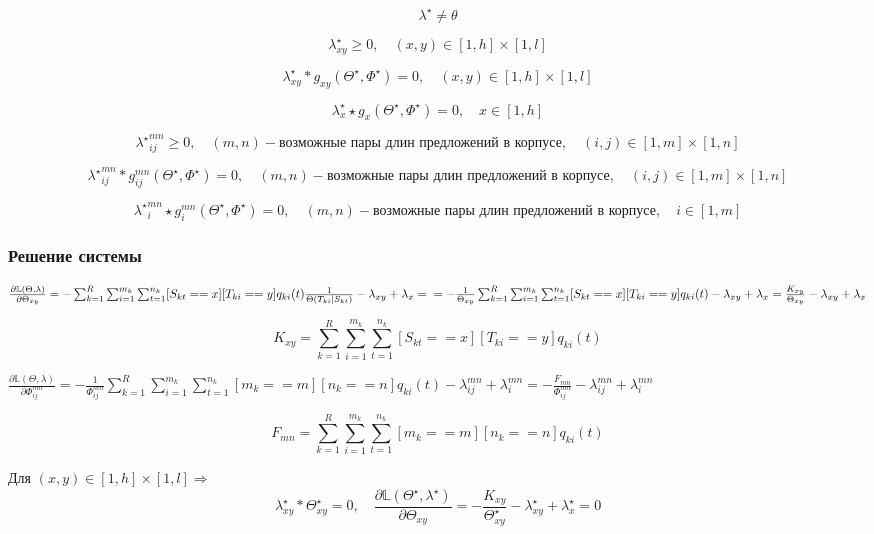 \documentclass[10pt]{article}
\begin{document}
	$$\lambda^{\star} \ne \theta
	$$
	
	$$ \lambda_{xy}^{\star} \geq 0, \quad (x, y) \in [1, h] \times [1, l]
	$$
	
	$$ \lambda_{xy}^{\star} * g_{xy}(\Theta^{\star}, \Phi^{\star}) = 0, \quad (x, y) \in [1, h] \times [1, l]
	$$
	
	$$ \lambda_x^{\star} \star g_{x}(\Theta^{\star}, \Phi^{\star}) = 0, \quad x \in [1, h]
	$$
	
	$$ {\lambda^{\star}}_{ij}^{mn} \geq 0, \quad (m, n) - \text{возможные пары длин предложений в корпусе}, \quad (i, j) \in [1, m] \times [1, n]
	$$
	
	$$ {\lambda^{\star}}_{ij}^{mn} * g_{ij}^{mn} (\Theta^{\star}, \Phi^{\star}) = 0, \quad (m, n) - \text{возможные пары длин предложений в корпусе}, \quad (i, j) \in [1, m] \times [1, n]
	$$
	
	$$ {\lambda^\star}_{i}^{mn} \star g_{i}^{mn}(\Theta^{\star}, \Phi^{\star}) = 0, \quad (m, n) - \text{возможные пары длин предложений в корпусе}, \quad i \in [1, m]
	$$
	
	
	\subsubsection*{Решение системы}
	
	$  \frac{\partial \mathbb{L} (\Theta, \lambda)} {\partial \Theta_{xy}} =
	- \sum_{k=1}^R \sum_{i=1}^{m_k} \sum_{t=1}^{n_k} [S_{kt}==x] [T_{ki} == y] q_{ki}(t) \frac{1}{\Theta(T_{ki} | S_{kt})}
	- \lambda_{xy} + \lambda_x =\\
	= - \frac{1}{\Theta_{xy}} \sum_{k=1}^R \sum_{i=1}^{m_k} \sum_{t=1}^{n_k} [S_{kt}==x][T_{ki} == y] q_{ki}(t)
	- \lambda_{xy} + \lambda_x = \frac{K_{xy}}{\Theta_{xy}} - \lambda_{xy} + \lambda_x $
	
	$$  K_{xy} = \sum_{k=1}^R \sum_{i=1}^{m_k} \sum_{t=1}^{n_k} [S_{kt}==x][T_{ki} == y] q_{ki}(t) $$
	
	$\frac{\partial \mathbb{L} (\Theta, \lambda)} {\partial \Phi_{ij}^{mn}}
	= - \frac{1}{\Phi_{ij}^{mn}} \sum_{k=1}^R \sum_{i=1}^{m_k} \sum_{t=1}^{n_k} [m_k==m][n_k==n] q_{ki}(t) - \lambda_{ij}^{mn} + \lambda_{i}^{mn}
	= - \frac{F_{mn}}{\Phi_{ij}^{mn}} - \lambda_{ij}^{mn} + \lambda_{i}^{mn}
	$
	
	$$ F_{mn} = \sum_{k=1}^R \sum_{i=1}^{m_k} \sum_{t=1}^{n_k} [m_k==m][n_k==n] q_{ki}(t)
	$$
	
	Для $ (x, y) \in [1, h] \times [1, l] \Rightarrow $\\
	$$ \lambda_{xy}^{\star} * \Theta_{xy}^{\star} = 0, \quad
	\frac{\partial \mathbb{L} (\Theta^{\star}, \lambda^{\star})} {\partial \Theta_{xy}} =
	- \frac{K_{xy}}{\Theta_{xy}^{\star}} - \lambda_{xy}^{\star} + \lambda_{x}^{\star} = 0
	$$
	
\end{document}

